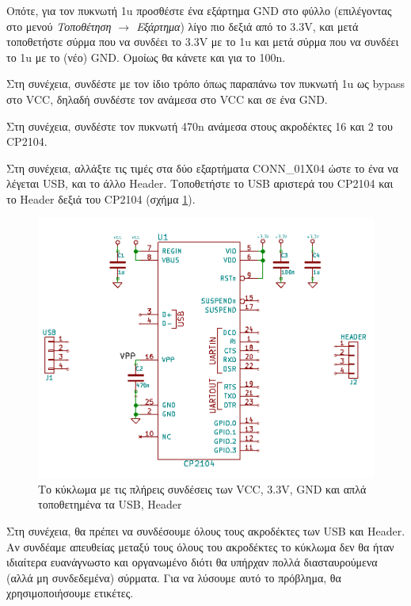 \documentclass[a4paper]{article}
\begin{document}
Οπότε, για τον πυκνωτή 1u προσθέστε ένα εξάρτημα GND στο φύλλο (επιλέγοντας στο μενού \textit{Τοποθέτηση $\rightarrow$ Εξάρτημα}) λίγο πιο δεξιά από το 3.3V, και μετά τοποθετήστε σύρμα που να συνδέει το 3.3V με το 1u και μετά σύρμα που να συνδέει το 1u με το (νέο) GND. Ομοίως θα κάνετε και για το 100n.

Στη συνέχεια, συνδέστε με τον ίδιο τρόπο όπως παραπάνω τον πυκνωτή 1u ως bypass στο VCC, δηλαδή συνδέστε τον ανάμεσα στο VCC και σε ένα GND.

Στη συνέχεια, συνδέστε τον πυκνωτή 470n ανάμεσα στους ακροδέκτες 16 και 2 του CP2104.

Στη συνέχεια, αλλάξτε τις τιμές στα δύο εξαρτήματα CONN\_01X04 ώστε το ένα να λέγεται USB, και το άλλο Header. Τοποθετήστε το USB αριστερά του CP2104 και το Header δεξιά του CP2104 (σχήμα \ref{fig:eesch-circ-allpwr}).

\begin{figure}
  \begin{center}
    \includegraphics[width=.9\textwidth]{img/eesch-circ-allpwr.png}
    \caption{Το κύκλωμα με τις πλήρεις συνδέσεις των VCC, 3.3V, GND και απλά τοποθετημένα τα USB, Header}
    \label{fig:eesch-circ-allpwr}
  \end{center}
\end{figure}

Στη συνέχεια, θα πρέπει να συνδέσουμε όλους τους ακροδέκτες των USB και Header. Αν συνδέαμε απευθείας μεταξύ τους όλους του ακροδέκτες το κύκλωμα δεν θα ήταν ιδιαίτερα ευανάγνωστο και οργανωμένο διότι θα υπήρχαν πολλά διασταυρούμενα (αλλά μη συνδεδεμένα) σύρματα. Για να λύσουμε αυτό το πρόβλημα, θα χρησιμοποιήσουμε ετικέτες.
\end{document}
